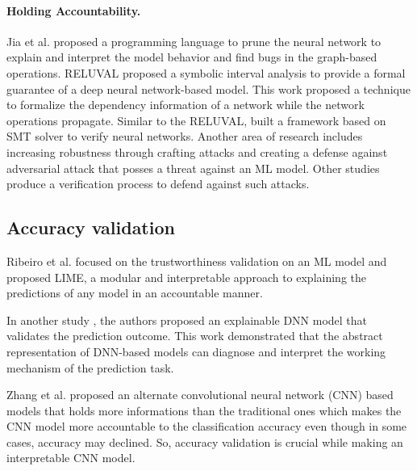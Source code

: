 \paragraph{Holding Accountability.}
Jia et al. \cite{jia2019taso} proposed a programming language to prune the neural network to explain and interpret the model behavior and find bugs in the graph-based operations. RELUVAL \cite{wang2018formal} proposed a symbolic interval analysis to provide a formal guarantee of a deep neural network-based model. This work proposed a technique to formalize the dependency information of a network while the network operations propagate. 
Similar to the RELUVAL, \cite{katz2017reluplex} built a framework based on SMT solver to verify neural networks. Another area of research includes increasing robustness through crafting attacks and creating a defense against adversarial attack \cite{papernot2016towards}  that posses a threat against an ML model. Other studies  \cite{anderson2019optimization,pan2019static} produce a verification process to defend against such attacks.


\subsection{\textbf{Accuracy validation}}
Ribeiro et al. \cite{ribeiro2016should} focused on the trustworthiness validation on an ML model and proposed LIME, a modular and interpretable approach to explaining the predictions of any model in an accountable manner. 

In another study \cite{du2018towards}, the authors proposed an explainable DNN model that validates the prediction outcome. This work demonstrated that the abstract representation of DNN-based models can diagnose and interpret the working mechanism of the prediction task. 

Zhang et al. \cite{zhang2018interpretable} proposed an alternate convolutional neural network (CNN) based models that holds more informations than the traditional ones which makes the CNN model more accountable to the classification accuracy even though in some cases, accuracy may declined. So, accuracy validation is crucial while making an interpretable CNN model.

